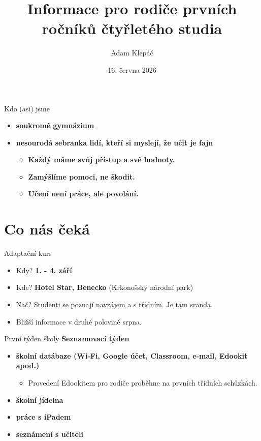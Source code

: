 \documentclass[
		czech,
		sections numbered,
		xcolor=dvipsnames,
		aspectratio=169,
]{beamer}
\title{Informace pro rodiče prvních ročníků čtyřletého studia}
\author{Adam Klepáč}
\institute[]{%
		Gymnázium Evolution Jižní Město
}
\date{16. června 2026}
\begin{document}
\maketitle

\begin{frame}{Kdo (asi) jsme}
		\begin{itemize}
				\item \textbf<1>{soukromé gymnázium}
						\pause
				\item \textbf<2>{nesourodá sebranka lidí, kteří si myslejí, že učit je fajn}
						\pause
						\begin{itemize}
								\item \textbf<3>{Každý máme svůj přístup a své hodnoty.}
										\pause
								\item \textbf<4>{Zamýšlíme pomoci, ne škodit.}
										\pause
								\item \textbf<5>{Učení není práce, ale povolání.}
						\end{itemize}
		\end{itemize}
\end{frame}

\section{Co nás čeká}

\begin{frame}{Adaptační kurs}
		\begin{itemize}
				\item Kdy? \textbf{1. - 4. září}
						\pause
				\item Kde? \textbf{Hotel Star, Benecko} (Krkonošský národní park)
						\pause
				\item Nač? Studenti se poznají navzájem a s třídním. Je tam sranda.
						\pause
				\item Bližší informace v druhé polovině srpna.
		\end{itemize}
\end{frame}

\begin{frame}{První týden školy}
		\textbf{Seznamovací týden}
		\begin{itemize}
				\item \textbf<1>{školní datábaze (Wi-Fi, Google účet, Classroom, e-mail,
						Edookit apod.)}
						\begin{itemize}
								\item Provedení Edookitem pro rodiče proběhne na prvních třídních
										schůzkách.
						\end{itemize}
						\pause
				\item \textbf<2>{školní jídelna}
						\pause
				\item \textbf<3>{práce s iPadem}
						\pause
				\item \textbf<4>{seznámení s učiteli}
		\end{itemize}
\end{frame}
\end{document}
